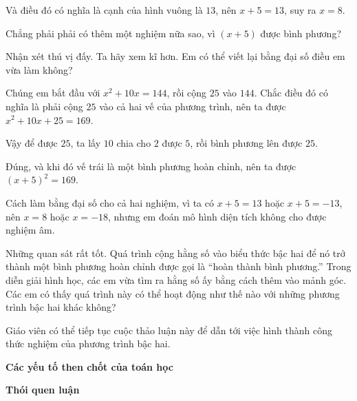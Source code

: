 {\begin{scriptlist}
    \item [Học sinh 1:] Và điều đó có nghĩa là cạnh của hình vuông là $13$, nên $x + 5 = 13$, suy ra $x = 8$.
    
    \item [Học sinh 2:] Chẳng phải phải có thêm một nghiệm nữa sao, vì $(x + 5)$ được bình phương?
    
    \item [Giáo viên:] Nhận xét thú vị đấy. Ta hãy xem kĩ hơn. Em có thể viết lại bằng đại số điều em vừa làm không?
    
    \item [Học sinh 2:] Chúng em bắt đầu với $x^2 + 10x = 144$, rồi cộng $25$ vào $144$. Chắc điều đó có nghĩa là phải cộng $25$ vào cả hai vế của phương trình, nên ta được $x^2 + 10x + 25 = 169$.
    
    \item [Học sinh 1:] Vậy để được $25$, ta lấy $10$ chia cho $2$ được $5$, rồi bình phương lên được $25$.
    
    \item [Học sinh 2:] Đúng, và khi đó vế trái là một bình phương hoàn chỉnh, nên ta được $(x + 5)^2 = 169$.
    
    \item [Học sinh 1:] Cách làm bằng đại số cho cả hai nghiệm, vì ta có $x + 5 = 13$ hoặc $x + 5 = -13$, nên $x = 8$ hoặc $x = -18$, nhưng em đoán mô hình diện tích không cho được nghiệm âm.
    
    \item [Giáo viên:] Những quan sát rất tốt. Quá trình cộng hằng số vào biểu thức bậc hai để nó trở thành một bình phương hoàn chỉnh được gọi là ``hoàn thành bình phương.'' Trong diễn giải hình học, các em vừa tìm ra hằng số ấy bằng cách thêm vào mảnh góc. Các em có thấy quá trình này có thể hoạt động như thế nào với những phương trình bậc hai khác không?
    \end{scriptlist}

    Giáo viên có thể tiếp tục cuộc thảo luận này để dẫn tới việc hình thành công thức nghiệm của phương trình bậc hai.

    \textbf{Các yếu tố then chốt của toán học}

    \begin{hanglist}
      \vspace{\baselineskip}
    \end{hanglist}    

    \textbf{Thói quen luận}

    \begin{hanglist}
      \vspace{\baselineskip}


    \end{hanglist}
  }
